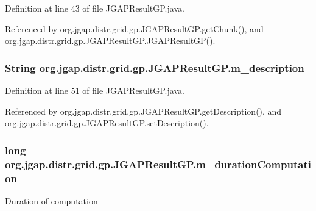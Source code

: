 Definition at line 43 of file J\-G\-A\-P\-Result\-G\-P.\-java.



Referenced by org.\-jgap.\-distr.\-grid.\-gp.\-J\-G\-A\-P\-Result\-G\-P.\-get\-Chunk(), and org.\-jgap.\-distr.\-grid.\-gp.\-J\-G\-A\-P\-Result\-G\-P.\-J\-G\-A\-P\-Result\-G\-P().

\hypertarget{classorg_1_1jgap_1_1distr_1_1grid_1_1gp_1_1_j_g_a_p_result_g_p_a9dd8a68da95efde6d9dad8b56d96de98}{
\subsubsection[{m\-\_\-description}]{\setlength{\rightskip}{0pt plus 5cm}String org.\-jgap.\-distr.\-grid.\-gp.\-J\-G\-A\-P\-Result\-G\-P.\-m\-\_\-description\hspace{0.3cm}{\ttfamily [private]}}}\label{classorg_1_1jgap_1_1distr_1_1grid_1_1gp_1_1_j_g_a_p_result_g_p_a9dd8a68da95efde6d9dad8b56d96de98}


Definition at line 51 of file J\-G\-A\-P\-Result\-G\-P.\-java.



Referenced by org.\-jgap.\-distr.\-grid.\-gp.\-J\-G\-A\-P\-Result\-G\-P.\-get\-Description(), and org.\-jgap.\-distr.\-grid.\-gp.\-J\-G\-A\-P\-Result\-G\-P.\-set\-Description().

\hypertarget{classorg_1_1jgap_1_1distr_1_1grid_1_1gp_1_1_j_g_a_p_result_g_p_a2fbabfb862da0868834432404b132fe7}{
\subsubsection[{m\-\_\-duration\-Computation}]{\setlength{\rightskip}{0pt plus 5cm}long org.\-jgap.\-distr.\-grid.\-gp.\-J\-G\-A\-P\-Result\-G\-P.\-m\-\_\-duration\-Computation\hspace{0.3cm}{\ttfamily [private]}}}\label{classorg_1_1jgap_1_1distr_1_1grid_1_1gp_1_1_j_g_a_p_result_g_p_a2fbabfb862da0868834432404b132fe7}
Duration of computation 

